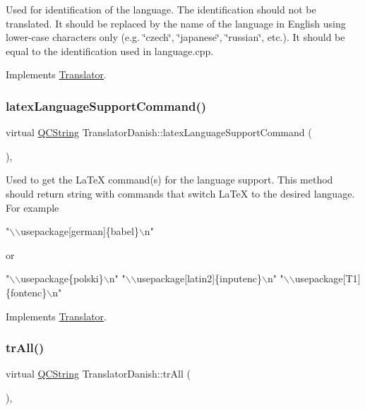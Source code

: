 Used for identification of the language. The identification should not be translated. It should be replaced by the name of the language in English using lower-\/case characters only (e.\+g. \char`\"{}czech\char`\"{}, \char`\"{}japanese\char`\"{}, \char`\"{}russian\char`\"{}, etc.). It should be equal to the identification used in language.\+cpp. 

Implements \mbox{\hyperlink{class_translator}{Translator}}.

\mbox{\label{class_translator_danish_ac4bb41e0786fcef60cbc30741af37c0a}} 
\subsubsection{\texorpdfstring{latexLanguageSupportCommand()}{latexLanguageSupportCommand()}}
{\footnotesize\ttfamily virtual \mbox{\hyperlink{class_q_c_string}{Q\+C\+String}} Translator\+Danish\+::latex\+Language\+Support\+Command (\begin{DoxyParamCaption}{ }\end{DoxyParamCaption})\hspace{0.3cm}{\ttfamily [inline]}, {\ttfamily [virtual]}}

Used to get the La\+TeX command(s) for the language support. This method should return string with commands that switch La\+TeX to the desired language. For example 
\begin{DoxyPre}"\(\backslash\)\(\backslash\)usepackage[german]\{babel\}\(\backslash\)n"
\end{DoxyPre}
 or 
\begin{DoxyPre}"\(\backslash\)\(\backslash\)usepackage\{polski\}\(\backslash\)n"
"\(\backslash\)\(\backslash\)usepackage[latin2]\{inputenc\}\(\backslash\)n"
"\(\backslash\)\(\backslash\)usepackage[T1]\{fontenc\}\(\backslash\)n"
\end{DoxyPre}
 

Implements \mbox{\hyperlink{class_translator}{Translator}}.

\mbox{\label{class_translator_danish_a95603ec5d4da100a4239606c48bd3a30}} 
\subsubsection{\texorpdfstring{trAll()}{trAll()}}
{\footnotesize\ttfamily virtual \mbox{\hyperlink{class_q_c_string}{Q\+C\+String}} Translator\+Danish\+::tr\+All (\begin{DoxyParamCaption}{ }\end{DoxyParamCaption})\hspace{0.3cm}{\ttfamily [inline]}, {\ttfamily [virtual]}}

